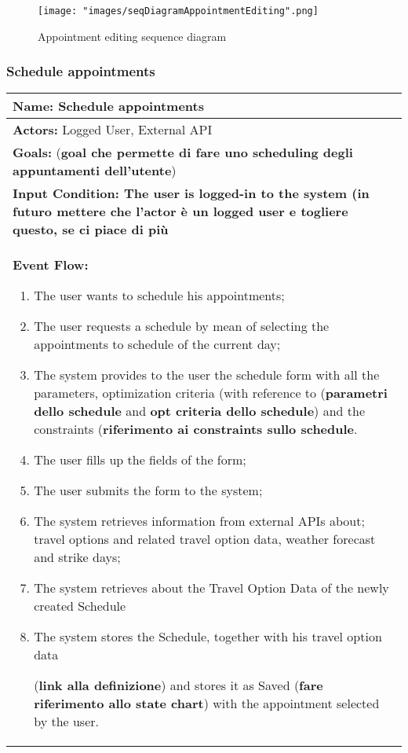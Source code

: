 \begin{figure}[H]
\begin{center}
\texttt{[image: "images/seqDiagramAppointmentEditing".png]}
\caption{Appointment editing sequence diagram}
\label{img:seqDiagrAppEditing00}
\end{center}
\end{figure}


\subsubsection{Schedule appointments}\label{usecase:scheduleappointments}
\begin{longtable}{|p{14cm}|} \hline
\textbf{Name:} Schedule appointments \\ \hline
\textbf{Actors:} Logged User, External API \\ \hline
\textbf{Goals:} (\textbf{goal che permette di fare uno scheduling degli appuntamenti dell'utente})\\ \hline
\textbf{Input Condition: The user is logged-in to the system (\textbf{in futuro mettere che l'actor è un logged user e togliere questo, se ci piace di più}} \\ \hline

\textbf{Event Flow:}
\begin{enumerate}
\item The user wants to schedule his appointments;
\item The user requests a schedule by mean of selecting the appointments to schedule of the current day;
\item The system provides to the user the schedule form with all the parameters, optimization criteria (with reference to (\textbf{parametri dello schedule} and \textbf{opt criteria dello schedule}) and the constraints (\textbf{riferimento ai constraints sullo schedule}.
\item The user fills up the fields of the form;
\item The user submits the form to the system;
\item The system retrieves information from external APIs about; travel options and related travel option data, weather forecast and strike days;
\item The system retrieves about the Travel Option Data of the newly created Schedule
\item The system stores the Schedule, together with his travel option data

(\textbf{link alla definizione}) and stores it as Saved (\textbf{fare riferimento allo state chart}) with the appointment selected by the user.
\end{enumerate}	\\ \hline


\end{longtable}
